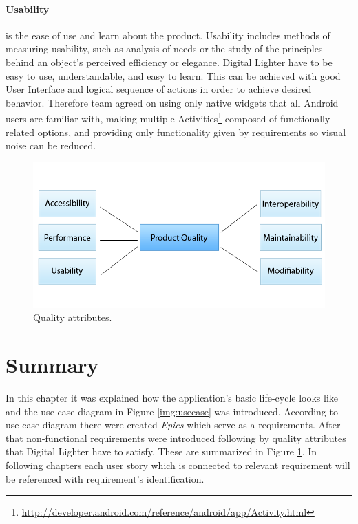 \paragraph{Usability}
is the ease of use and learn about the product.
Usability includes methods of measuring usability, such as analysis of needs or the study of the principles behind an object's perceived efficiency or elegance. Digital Lighter have to be easy to use, understandable, and easy to learn. This can be achieved with good User Interface and logical sequence of actions in order to achieve desired behavior. Therefore team agreed on using only native widgets that all Android users are familiar with, making multiple Activities\footnote{\url{http://developer.android.com/reference/android/app/Activity.html}} composed of functionally related options, and providing only functionality given by requirements so visual noise can be reduced. 

\begin{figure}[!ht]
    \begin{center}
    \includegraphics[scale=0.5]{requirements/quality.png}
    \caption{Quality attributes.}
    \label{img:qualityAttributes}
    \end{center}
\end{figure}

\section{Summary}
In this chapter it was explained how the application's basic life-cycle looks like and the use case diagram in Figure \ref{img:usecase} was introduced.
According to use case diagram there were created \emph{Epics} which serve as a requirements. 
After that non-functional requirements were introduced following by quality attributes that Digital Lighter have to satisfy.
These are summarized in Figure \ref{img:qualityAttributes}.
In following chapters each user story which is connected to relevant requirement will be referenced with requirement's identification.

